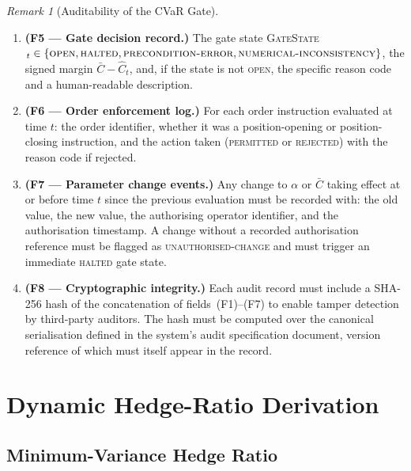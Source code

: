 \documentclass[12pt,openany]{book}
\numberwithin{equation}{chapter}
\theoremstyle{plain}
\theoremstyle{definition}
\theoremstyle{remark}
\newtheorem{remark}[theorem]{Remark}
\numberwithin{equation}{chapter}
\theoremstyle{plain}
\begin{document}
\begin{remark}[Auditability of the CVaR Gate]
\begin{enumerate}
  \item \textbf{(F5 --- Gate decision record.)}
        The gate state \textsc{GateState}$_t \in
        \{\textsc{open},\textsc{halted},\textsc{precondition-error},
        \textsc{numerical-inconsistency}\}$,
        the signed margin $\bar{C} - \hat{C}_t$,
        and, if the state is not \textsc{open}, the specific
        reason code and a human-readable description.

  \item \textbf{(F6 --- Order enforcement log.)}
        For each order instruction evaluated at time $t$: the
        order identifier, whether it was a position-opening or
        position-closing instruction, and the action taken
        (\textsc{permitted} or \textsc{rejected}) with the
        reason code if rejected.

  \item \textbf{(F7 --- Parameter change events.)}
        Any change to $\alpha$ or $\bar{C}$ taking effect at or
        before time $t$ since the previous evaluation must be
        recorded with: the old value, the new value, the
        authorising operator identifier, and the authorisation
        timestamp.  A change without a recorded authorisation
        reference must be flagged as \textsc{unauthorised-change}
        and must trigger an immediate \textsc{halted} gate state.

  \item \textbf{(F8 --- Cryptographic integrity.)}
        Each audit record must include a SHA-256 hash of the
        concatenation of fields~(F1)--(F7) to enable tamper
        detection by third-party auditors.  The hash must be
        computed over the canonical serialisation defined in
        the system's audit specification document, version
        reference of which must itself appear in the record.
\end{enumerate}
\end{remark}

\chapter{Dynamic Hedge-Ratio Derivation}
\label{ch:hedge}

\section{Minimum-Variance Hedge Ratio}
\end{document}
